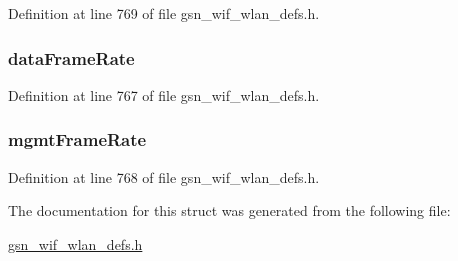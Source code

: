 Definition at line 769 of file gsn\_\-wif\_\-wlan\_\-defs.h.

\hypertarget{a00409_acfcf913585542d61df9a4a9f7086decf}{
\subsubsection[{dataFrameRate}]{ {\bf dataFrameRate}}}
\label{a00409_acfcf913585542d61df9a4a9f7086decf}


Definition at line 767 of file gsn\_\-wif\_\-wlan\_\-defs.h.

\hypertarget{a00409_aa827f7462c7eec42efd9a93314d01fed}{
\subsubsection[{mgmtFrameRate}]{ {\bf mgmtFrameRate}}}
\label{a00409_aa827f7462c7eec42efd9a93314d01fed}


Definition at line 768 of file gsn\_\-wif\_\-wlan\_\-defs.h.



The documentation for this struct was generated from the following file:\begin{DoxyCompactItemize}
\item 
\hyperlink{a00613}{gsn\_\-wif\_\-wlan\_\-defs.h}\end{DoxyCompactItemize}
